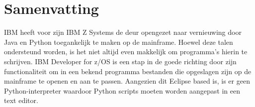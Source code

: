 
%
%
%
%
%

%



\chapter*{Samenvatting}
IBM heeft voor zijn IBM Z Systems de deur opengezet naar vernieuwing door Java en Python toegankelijk te maken op de mainframe. Hoewel deze talen ondersteund worden, is het niet altijd even makkelijk om programma's hierin te schrijven. IBM Developer for z/OS is een stap in de goede richting door zijn functionaliteit om in een bekend programma bestanden die opgeslagen zijn op de mainframe te openen en aan te passen. Aangezien dit Eclipse based is, is er geen Python-interpreter waardoor Python scripts moeten worden aangepast in een text editor. \\

